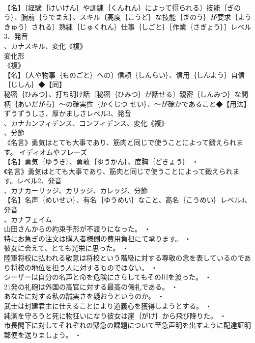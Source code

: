 \documentclass[8pt]{extreport}
\begin{document}
\begin{CJK}{UTF8}{min}
\\	【名】〔経験｛けいけん｝や訓練｛くんれん｝によって得られる〕技能｛ぎのう｝、腕前｛うでまえ｝、スキル〔高度｛こうど｝な技能｛ぎのう｝が要求｛ようきゅう｝される〕熟練｛じゅくれん｝仕事｛しごと｝［作業｛さぎょう｝］レベル3、発音
\\	、カナスキル、変化《複》
\\	変化形 
\\	《複》
\\	【名】〔人や物事｛ものごと｝への〕信頼｛しんらい｝、信用｛しんよう｝自信｛じしん｝◆【同】
\\	秘密｛ひみつ｝、打ち明け話〔秘密｛ひみつ｝が話せる〕親密｛しんみつ｝な間柄｛あいだがら｝～の確実性｛かくじつ せい｝、～が確かであること◆【用法】
\\	ずうずうしさ、厚かましさレベル3、発音
\\	、カナカンフィデンス、コンフィデンス、変化《複》
\\	、分節
\\	《名言》勇気はとても大事であり、筋肉と同じで使うことによって鍛えられます。	イディオムやフレーズ 
\\	【名】勇気｛ゆうき｝、勇敢｛ゆうかん｝、度胸｛どきょう｝ ・
\\	《名言》勇気はとても大事であり、筋肉と同じで使うことによって鍛えられます。レベル2、発音
\\	、カナカーリッジ、カリッジ、カレッジ、分節
\\	【名】名声｛めいせい｝、有名｛ゆうめい｝なこと、高名｛こうめい｝レベル4、発音
\\	、カナフェイム
\\	山田さんからの約束手形が不渡りになった。 ・
\\	特にお急ぎの注文は購入者様側の費用負担にて承ります。 ・
\\	彼女に会えて、とても光栄に思った。 ・
\\	陸軍将校に払われる敬意は将校という階級に対する尊敬の念を表しているのであり将校の地位を担う人に対するものではない。 ・
\\	シーザーは自分の名声と命を危険にさらしてもその川を渡った。 ・
\\	21発の礼砲は外国の高官に対する最高の儀礼である。 ・
\\	あなたに対する私の誠実さを疑おうというのか。 ・
\\	武士は封建君主に仕えることにより道義心を獲得しようとする。 ・
\\	純潔を守ろうと死に物狂いになり彼女は崖｛がけ｝から飛び降りた。 ・
\\	市長閣下に対してそれぞれの緊急の課題について至急声明を出すように配達証明郵便を送りましょう。 ・

\end{CJK}
\end{document}
